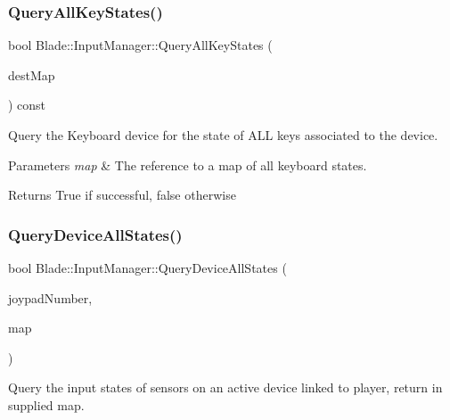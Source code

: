 \subsubsection{\texorpdfstring{Query\+All\+Key\+States()}{QueryAllKeyStates()}}
{\footnotesize\ttfamily bool Blade\+::\+Input\+Manager\+::\+Query\+All\+Key\+States (\begin{DoxyParamCaption}\item[{std\+::map$<$ \hyperlink{namespace_blade_a15d9bde4921fb2a9a953f8d97ea49d1c}{Virtual\+Key}, bool $>$ \&}]{dest\+Map }\end{DoxyParamCaption}) const\hspace{0.3cm}{\ttfamily [noexcept]}}



Query the Keyboard device for the state of A\+LL keys associated to the device. 


\begin{DoxyParams}{Parameters}
{\em map} & The reference to a map of all keyboard states. \\
\hline
\end{DoxyParams}
\begin{DoxyReturn}{Returns}
True if successful, false otherwise 
\end{DoxyReturn}
\mbox{\label{class_blade_1_1_input_manager_ac07153a9c34d35a445ede6c89aa6cbf3}} 
\subsubsection{\texorpdfstring{Query\+Device\+All\+States()}{QueryDeviceAllStates()}}
{\footnotesize\ttfamily bool Blade\+::\+Input\+Manager\+::\+Query\+Device\+All\+States (\begin{DoxyParamCaption}\item[{Joypad\+Number}]{joypad\+Number,  }\item[{std\+::map$<$ \hyperlink{namespace_blade_a1ecca198b7e0afbe43139ec2b0db937c}{Input\+Sensor}, bool $>$ \&}]{map }\end{DoxyParamCaption})}



Query the input states of sensors on an active device linked to player, return in supplied map. 



